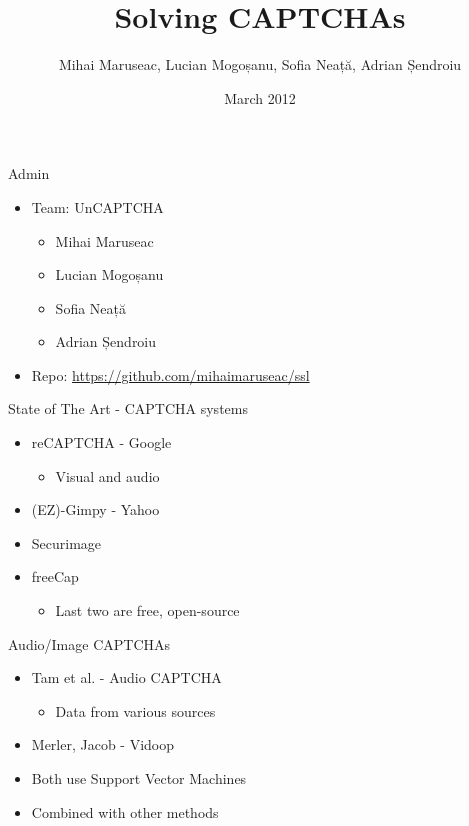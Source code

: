 \documentclass[red]{beamer}
\begin{document}
\title{Solving CAPTCHAs}
\author[MM, LM, SN, AS]{Mihai Maruseac, Lucian Mogoșanu, Sofia Neață, Adrian Șendroiu}
\date{March 2012}


\maketitle

\begin{frame}{Admin}
  \begin{itemize}
    \item Team: UnCAPTCHA
      \begin{itemize}
        \item Mihai Maruseac
        \item Lucian Mogoșanu
        \item Sofia Neață
        \item Adrian Șendroiu
      \end{itemize}
    \item Repo: \url{https://github.com/mihaimaruseac/ssl}
  \end{itemize}
\end{frame}

\begin{frame}{State of The Art - CAPTCHA systems}
  \begin{itemize}
  	\item reCAPTCHA - Google
	\begin{itemize}
		\item Visual and audio
	\end{itemize}
	\item (EZ)-Gimpy - Yahoo
	\item Securimage
	\item freeCap
	\begin{itemize}
		\item Last two are free, open-source
	\end{itemize}
  \end{itemize}
\end{frame}

\begin{frame}{Audio/Image CAPTCHAs}
  \begin{itemize}
  	\item Tam et al. - Audio CAPTCHA
	\begin{itemize}
		\item Data from various sources
	\end{itemize}
	\item Merler, Jacob - Vidoop
	\pause
	\item Both use Support Vector Machines
	\item Combined with other methods
  \end{itemize}
\end{frame}
\end{document}
